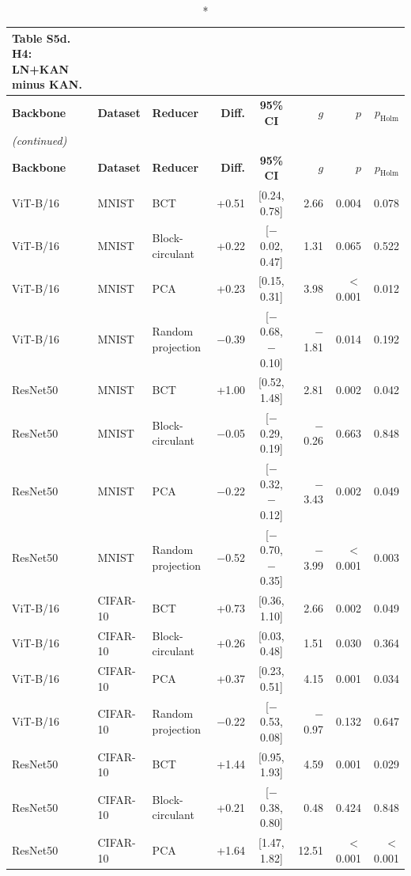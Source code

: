 \documentclass[10pt]{article}
\begin{document}
\scriptsize
\setlength{\tabcolsep}{3pt}
\begin{longtable}{lllrcrrr}
\caption*{\textbf{Table S5d.} H4: LN+KAN minus KAN.}\\
\toprule
\textbf{Backbone} & \textbf{Dataset} & \textbf{Reducer} & \textbf{Diff.} & \textbf{95\% CI} & \textbf{$g$} & \textbf{$p$} & \textbf{$p_{\mathrm{Holm}}$} \\
\midrule
\endfirsthead
\multicolumn{8}{l}{\textit{(continued)}}\\
\toprule
\textbf{Backbone} & \textbf{Dataset} & \textbf{Reducer} & \textbf{Diff.} & \textbf{95\% CI} & \textbf{$g$} & \textbf{$p$} & \textbf{$p_{\mathrm{Holm}}$} \\
\midrule
\endhead
\bottomrule
\endfoot
ViT-B/16 & MNIST & BCT & +0.51 & [0.24, 0.78] & 2.66 & 0.004 & 0.078 \\
ViT-B/16 & MNIST & Block-circulant & +0.22 & [$-$0.02, 0.47] & 1.31 & 0.065 & 0.522 \\
ViT-B/16 & MNIST & PCA & +0.23 & [0.15, 0.31] & 3.98 & $<$0.001 & 0.012 \\
ViT-B/16 & MNIST & Random projection & $-$0.39 & [$-$0.68, $-$0.10] & $-$1.81 & 0.014 & 0.192 \\
ResNet50 & MNIST & BCT & +1.00 & [0.52, 1.48] & 2.81 & 0.002 & 0.042 \\
ResNet50 & MNIST & Block-circulant & $-$0.05 & [$-$0.29, 0.19] & $-$0.26 & 0.663 & 0.848 \\
ResNet50 & MNIST & PCA & $-$0.22 & [$-$0.32, $-$0.12] & $-$3.43 & 0.002 & 0.049 \\
ResNet50 & MNIST & Random projection & $-$0.52 & [$-$0.70, $-$0.35] & $-$3.99 & $<$0.001 & 0.003 \\
ViT-B/16 & CIFAR-10 & BCT & +0.73 & [0.36, 1.10] & 2.66 & 0.002 & 0.049 \\
ViT-B/16 & CIFAR-10 & Block-circulant & +0.26 & [0.03, 0.48] & 1.51 & 0.030 & 0.364 \\
ViT-B/16 & CIFAR-10 & PCA & +0.37 & [0.23, 0.51] & 4.15 & 0.001 & 0.034 \\
ViT-B/16 & CIFAR-10 & Random projection & $-$0.22 & [$-$0.53, 0.08] & $-$0.97 & 0.132 & 0.647 \\
ResNet50 & CIFAR-10 & BCT & +1.44 & [0.95, 1.93] & 4.59 & 0.001 & 0.029 \\
ResNet50 & CIFAR-10 & Block-circulant & +0.21 & [$-$0.38, 0.80] & 0.48 & 0.424 & 0.848 \\
ResNet50 & CIFAR-10 & PCA & +1.64 & [1.47, 1.82] & 12.51 & $<$0.001 & $<$0.001 \\

\end{longtable}
\end{document}
